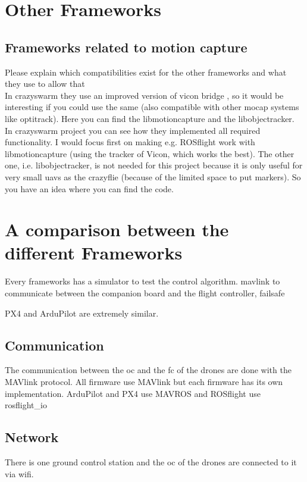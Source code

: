 \section{Other Frameworks}
\subsection{Frameworks related to motion capture}
{\color{red}Please explain which compatibilities exist for the other frameworks and what they use to allow that \\}
{\color{red}In crazyswarm they use an improved version of vicon bridge \cite{ros_wiki_vicon_bridge}, so it would be interesting if you could use the same (also compatible with other mocap systems like optitrack). Here \cite{github_usc_actlab} you can find the libmotioncapture and the libobjectracker. In crazyswarm project you can see how they implemented all required functionality. I would focus first on making e.g. ROSflight work with libmotioncapture (using the tracker of Vicon, which works the best). The other one, i.e. libobjectracker, is not needed for this project because it is only useful for very small uavs as the crazyflie (because of the limited space to put markers). So you have an idea where you can find the code.\\}

\section{A comparison between the different Frameworks}
Every frameworks has a simulator to test the control algorithm.
mavlink to communicate between the companion board and the flight controller, failsafe

PX4 and ArduPilot are extremely similar.

\subsection{Communication}
The communication between the \gls{oc} and the \gls{fc} of the drones are done with the MAVlink protocol. All firmware use MAVlink but each firmware has its own implementation. ArduPilot and PX4 use MAVROS and ROSflight use rosflight\_io

\subsection{Network}
There is one ground control station and the \gls{oc} of the drones are connected to it via wifi.

